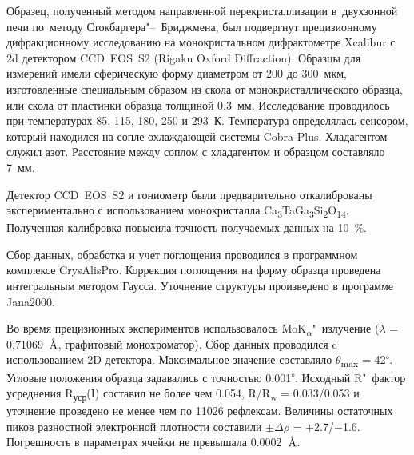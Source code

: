 Образец, полученный методом направленной перекристаллизации в~двухзонной печи по~методу Стокбаргера"--~Бриджмена, был подвергнут прецизионному дифракционному исследованию на монокристальном дифрактометре Xcalibur с 2d детектором CCD~EOS~S2 (Rigaku Oxford Diffraction). Образцы для измерений имели сферическую форму диаметром от 200 до 300~мкм, изготовленные специальным образом из скола от монокристаллического образца, или скола от пластинки образца толщиной 0.3~мм. Исследование проводилось при температурах 85, 115, 180, 250 и 293~К\cite{Dudka2016}. Температура определялась сенсором, который находился на сопле охлаждающей системы Cobra Plus. Хладагентом служил азот. Расстояние между соплом с хладагентом и образцом составляло 7~мм.

Детектор CCD~EOS~S2 и гониометр были предварительно откалиброваны экспериментально\cite{Dudka2010} с использованием монокристалла Ca\textsubscript{3}TaGa\textsubscript{3}Si\textsubscript{2}O\textsubscript{14}\cite{Dudka2016_b}. Полученная калибровка повысила точность получаемых данных на 10~\%.

Сбор данных, обработка и учет поглощения проводился в программном комплексе  CrysAlisPro. Коррекция поглощения на форму образца проведена интегральным методом Гаусса. Уточнение структуры произведено в программе Jana2000\cite{Dusek2001}.






Во время прецизионных  экспериментов использовалось MoK\textsubscript{$\alpha$}"~излучение ($\lambda$ = 0,71069~${\mbox{\normalfont\AA}}$, графитовый монохроматор). Сбор данных проводился c использованием 2D детектора. Максимальное значение составляло $\theta$\textsubscript{max} = 42\textsuperscript{$\circ$}.
Угловые положения образца задавались с точностью 0.001\textsuperscript{$\circ$}.
Исходный R"~фактор усреднения R\textsubscript{уср}(I) составил не более чем 0.054, R/R\textsubscript{w} = 0.033/0.053 и уточнение проведено не менее чем по 11026 рефлексам.
Величины остаточных пиков разностной электронной плотности составили $\pm\Delta$$\rho$ = +2.7/$-$1.6.
Погрешность в параметрах ячейки не превышала 0.0002~{$\mbox{\normalfont\AA}$}.

